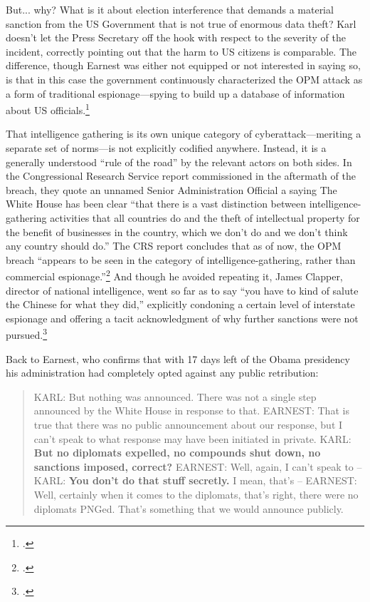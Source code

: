\documentclass{report}
\begin{document}
\begin{refsegment}
But... why? What is it about election interference that demands a material sanction from the US Government that is not true of enormous data theft? Karl doesn't let the Press Secretary off the hook with respect to the severity of the incident, correctly pointing out that the harm to US citizens is comparable. The difference, though Earnest was either not equipped or not interested in saying so, is that in this case the government continuously characterized the OPM attack as a form of traditional espionage---spying to build up a database of information about US officials.\footcite{nakashima_chinese_2015}

That intelligence gathering is its own unique category of cyberattack---meriting a separate set of norms---is not explicitly codified anywhere. Instead, it is a generally understood ``rule of the road'' by the relevant actors on both sides. In the Congressional Research Service report commissioned in the aftermath of the breach, they quote an unnamed Senior Administration Official a saying The White House has been clear ``that there is a vast distinction between intelligence-gathering activities that all countries do and the theft of intellectual property for the benefit of businesses in the country, which we don’t do and we don’t think any country should do.'' The CRS report concludes that as of now, the OPM breach ``appears to be seen in the category of intelligence-gathering, rather than commercial espionage.''\footcite{finklea_cyber_2015} And though he avoided repeating it, James Clapper, director of national intelligence, went so far as to say ``you have to kind of salute the Chinese for what they did,'' explicitly condoning a certain level of interstate espionage and offering a tacit acknowledgment of why further sanctions were not pursued.\footcite{sanger_u.s._2015}

Back to Earnest, who confirms that with 17 days left of the Obama presidency his administration had completely opted against any public retribution:
\begin{quote}
KARL: But nothing was announced. There was not a single step announced by the White House in response to that.
\newline \newline
EARNEST: That is true that there was no public announcement about our response, but I can't speak to what response may have been initiated in private.
\newline \newline
KARL: \textbf{But no diplomats expelled, no compounds shut down, no sanctions imposed, correct?}
\newline \newline
EARNEST: Well, again, I can't speak to --
\newline \newline
KARL: \textbf{You don't do that stuff secretly.}  I mean, that's --
\newline \newline
EARNEST: Well, certainly when it comes to the diplomats, that's right, there were no diplomats PNGed. That's something that we would announce publicly.
\end{quote}


\end{refsegment}
\end{document}
